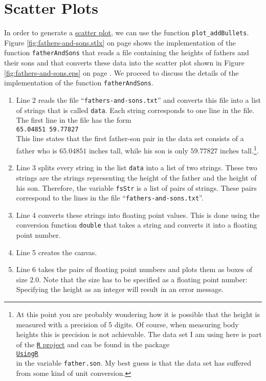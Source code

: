 \section{Scatter Plots}
In order to generate a \href{https://en.wikipedia.org/wiki/Scatter_plot}{scatter plot}, we can use
the function \texttt{plot\_addBullets}.  Figure \ref{fig:fathers-and-sons.stlx} on page
\pageref{fig:fathers-and-sons.stlx} shows the implementation of the function \texttt{fatherAndSons}
that reads a file containing the heights of fathers and their sons and that converts these data into
the scatter plot shown in Figure \ref{fig:fathers-and-sons.eps} on page
\pageref{fig:fathers-and-sons.eps}.  We proceed to discuss the details of the implementation of the
function \texttt{fatherAndSons}.
\begin{enumerate}
\item Line 2 reads the file ``\texttt{fathers-and-sons.txt}'' and converts this file into a list of
      strings that is called \texttt{data}.  Each string corresponds to one line in the file.
      The first line in the file has the form 
      \\[0.2cm]
      \hspace*{1.3cm}
      \texttt{65.04851 59.77827}
      \\[0.2cm]
      This line states that the first father-son pair in the data set consists of a father who is
      $65.04851$ inches tall, while his son is only $59.77827$ inches tall.\footnote{
        At this point you are probably wondering how it is possible that the height is measured with a
        precision of 5 digits.  Of course, when measuring body heights this is precision is not
        achievable.  The data set I am using here is part of
        the \href{http://www.r-project.org}{\texttt{R} project} and can be found in the package
        \\[0.2cm]
        \hspace*{1.3cm}
        \href{http://www.inside-r.org/packages/cran/UsingR/docs/father.son}{\texttt{UsingR}}
        \\[0.2cm]
        in the variable \texttt{father.son}. 
        My best guess is that the data set has suffered from some kind of unit conversion. 
      }.
\item Line 3 splits every string in the list \texttt{data} into a list of two strings.  These two
      strings are the strings representing the height of the father and the height of his son.
      Therefore, the variable \texttt{fsStr} is a list of pairs of strings.  These pairs correspond
      to the lines in the file ``\texttt{fathers-and-sons.txt}''.
\item Line 4 converts these strings into floating point values.  This is done using the conversion
      function \texttt{double} that takes a string and converts it into a floating point number.
\item Line 5 creates the canvas.
\item Line 6 takes the pairs  of floating point numbers and plots them as boxes of size $2.0$.
      Note that the size has to be specified as a floating point number:  Specifying the height as
      an integer will result in an error message.


\end{enumerate}
